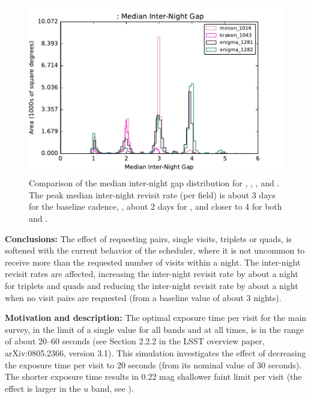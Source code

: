 \begin{figure}[h]
\includegraphics[angle=0,width=0.99\hsize:,clip]{figs/med-internight.pdf}
\caption{
Comparison of the median inter-night gap distribution for
, ,
, and
.
The peak median inter-night revisit rate (per field) is about 3 days for the
baseline cadence, , about 2 days for
, and closer to 4 for both
 and
.}
\label{fig:internightgapCompare}
\end{figure}

{\bf Conclusions:}
The effect of requesting pairs, single visits, triplets or quads, is
softened with the current behavior of the scheduler, where it is not
uncommon to receive more than the requested number of visits within a
night. The inter-night revisit rates are affected, increasing the
inter-night revisit rate by about a night for triplets and quads and
reducing the inter-night revisit rate by about a night when no visit
pairs are requested (from a baseline value of about 3 nights).





{\bf Motivation and description:} The optimal exposure time per visit
for the main survey, in the limit of a single value for all bands and
at all times, is in the range of about 20--60 seconds (see Section
2.2.2 in the LSST overview paper, arXiv:0805.2366, version 3.1). This
simulation investigates the effect of decreasing the exposure time per
visit to 20 seconds (from its nominal value of 30 seconds). The
shorter exposure time results in 0.22 mag shallower faint limit per
visit (the effect is larger in the $u$ band, see
). \\

